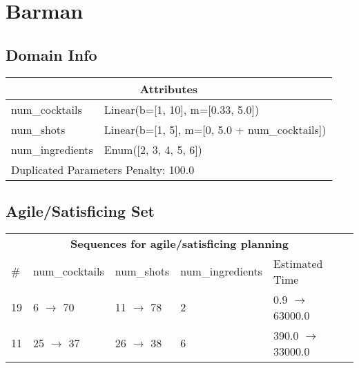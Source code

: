\documentclass{article}
\begin{document}
        \newpage \section{Barman}
                    \subsection*{Domain Info}

                    \begin{center}
                    \begin{tabular}{@{}p{}p{}@{}}
                    \multicolumn{2}{c}{\bf \large Attributes}\\\midrule
                    num\_cocktails & Linear(b=[1, 10], m=[0.33, 5.0])\\
num\_shots & Linear(b=[1, 5], m=[0, 5.0 + num\_cocktails])\\
num\_ingredients & Enum([2, 3, 4, 5, 6])
                    
                     \\\midrule
                    \multicolumn{2}{l}{Duplicated Parameters Penalty: 100.0}
                    \end{tabular}
                    \end{center}
                
                         \subsection*{Agile/Satisficing Set}

                        \begin{center}
                        \begin{tabular}{@{}l|l|l|l|l@{}}
                        \multicolumn{5}{c}{\bf \large Sequences for agile/satisficing planning}\\
                        \# & num\_cocktails & num\_shots & num\_ingredients & Estimated Time\\\midrule
                        19&6 $\rightarrow$ 70&11 $\rightarrow$ 78&2&0.9 $\rightarrow$ 63000.0\\
11&25 $\rightarrow$ 37&26 $\rightarrow$ 38&6&390.0 $\rightarrow$ 33000.0
                        \end{tabular}
                        \end{center}
                    
\end{document}

